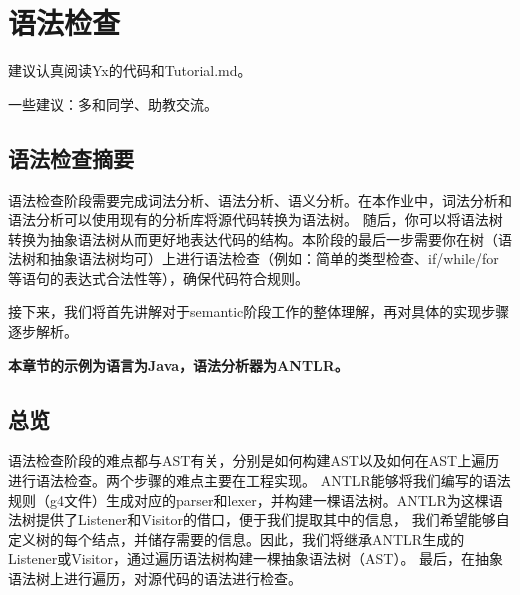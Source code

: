 

\chapter{语法检查}

\begin{introduction}
    \item 建议认真阅读Yx的代码和Tutorial.md。
    \item 一些建议：多和同学、助教交流。
\end{introduction}


\section{语法检查摘要}
语法检查阶段需要完成词法分析、语法分析、语义分析。在本作业中，词法分析和语法分析可以使用现有的分析库将源代码转换为语法树。
随后，你可以将语法树转换为抽象语法树从而更好地表达代码的结构。本阶段的最后一步需要你在树（语法树和抽象语法树均可）上进行语法检查（例如：简单的类型检查、if/while/for等语句的表达式合法性等），确保代码符合规则。

接下来，我们将首先讲解对于semantic阶段工作的整体理解，再对具体的实现步骤逐步解析。

\begin{remark}
    \textbf{本章节的示例为语言为Java，语法分析器为ANTLR。}
\end{remark}

\section{总览}
语法检查阶段的难点都与AST有关，分别是如何构建AST以及如何在AST上遍历进行语法检查。两个步骤的难点主要在工程实现。
ANTLR能够将我们编写的语法规则（g4文件）生成对应的parser和lexer，并构建一棵语法树。ANTLR为这棵语法树提供了Listener和Visitor的借口，便于我们提取其中的信息，
我们希望能够自定义树的每个结点，并储存需要的信息。因此，我们将继承ANTLR生成的Listener或Visitor，通过遍历语法树构建一棵抽象语法树（AST）。
最后，在抽象语法树上进行遍历，对源代码的语法进行检查。


